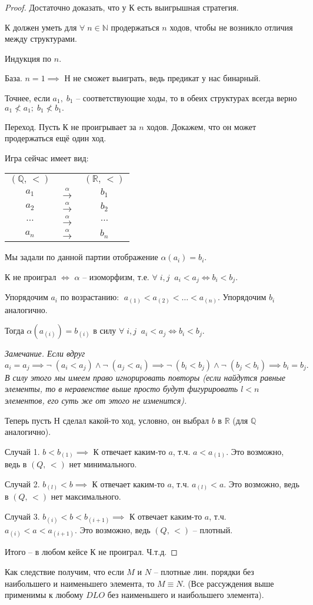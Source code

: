 \documentclass[a4paper, fleqn]{article}
\begin{document}
    \begin{proof}
    Достаточно доказать, что у К есть выигрышная стратегия.
    
    К должен уметь для $\forall \; n \in \mathbb{N}$  продержаться  $n$ ходов, чтобы не возникло отличия между структурами.
    
    Индукция по $n$.
    
    База. $n = 1 \implies $ Н не сможет выиграть, ведь предикат у нас бинарный. 
    
    Точнее, если $a_1, \; b_1$ -- соответствующие ходы, то в обеих структурах всегда верно $a_1 \nless a_1; \; b_1 \nless b_1.$
    
    Переход. Пусть К не проигрывает за $n$  ходов. Докажем, что он может продержаться ещё один ход.
    
    Игра сейчас имеет вид: 
    
     \begin{tabular}{ccc}
         $(\mathbb{Q}, \, <)$ & & $(\mathbb{R}, \, <)$ \\
         $a_1$ & $\xrightarrow{\alpha}$  & $b_1$\\
         $a_2$ & $\xrightarrow{\alpha}$  & $b_2$\\
         $\dots$ & $\xrightarrow{\alpha}$  & $\dots$\\
         $a_n$ & $\xrightarrow{\alpha}$  & $b_n$
    \end{tabular}
    
    Мы задали по данной партии отображение $\alpha(a_i) = b_i.$
    
    К не проиграл $\iff$ $\alpha$ -- изоморфизм, т.е. $\forall \; i, j \; \;  a_i < a_j \iff b_i < b_j.$
    
    Упорядочим $a_i$ по возрастанию:  $ \; a_{(1)} < a_{(2)} < \dots < a_{(n)}$. Упорядочим  $b_i$ аналогично.
    
    Тогда $\alpha(a_{(i)}) = b_{(i)}$ в силу $\forall \; i, j \; \;  a_i < a_j \iff b_i < b_j.$
    
    \textit{Замечание. Если вдруг $a_i = a_j \implies \neg \; (a_i < a_j) \land \neg \; (a_j < a_i) \implies
     \neg \; (b_i < b_j) \land \neg \; (b_j < b_i) \implies b_i = b_j.$ В силу этого мы имеем право игнорировать повторы (если найдутся равные элементы, то в неравенстве выше просто будут фигурировать $l < n$ элементов,  его суть же от этого не изменится).}
    
    Теперь пусть Н сделал какой-то ход, условно, он выбрал $b$ в $\mathbb{R}$  (для $\mathbb{Q}$ аналогично).
    
    Случай 1. $b < b_{(1)} \implies$ К отвечает каким-то  $a $, т.ч. $a < a_{(1)}.$ Это возможно, ведь в $(Q, \, <)$ нет минимального.
    
    Случай 2. $b_{(l)} < b  \implies$ К отвечает каким-то  $a $, т.ч. $a_{(l)} < a.$ Это возможно, ведь в $(Q, \, <)$ нет максимального.
    
    Случай 3. $b_{(i)} < b < b_{(i + 1)} \implies $   К отвечает каким-то  $a $, т.ч. $a_{(i)} < a < a_{(i + 1)}.$ Это возможно, ведь  $(Q, \, <)$ -- плотный.
    
    Итого -- в любом кейсе К не проиграл. Ч.т.д.
    
    \end{proof}
    
    Как следствие получим, что  если $M$ и $N$ -- плотные лин. порядки без наибольшего и наименьшего элемента, то  $M \equiv N.$  (Все рассуждения выше применимы к любому $DLO$ без наименьшего и наибольшего элемента).
    
\end{document}
